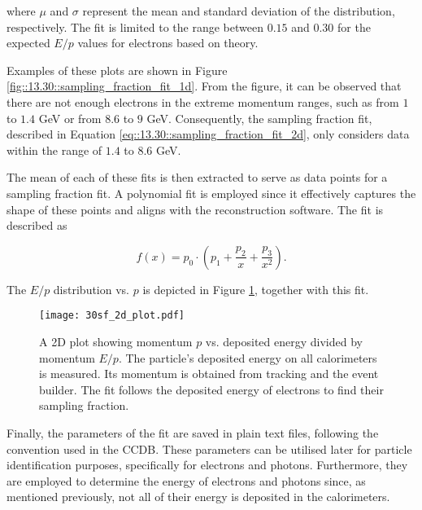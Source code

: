     where $\mu$ and $\sigma$ represent the mean and standard deviation of the distribution, respectively. The fit is limited to the range between $0.15$ and $0.30$ for the expected $E/p$ values for electrons based on theory.

    Examples of these plots are shown in Figure \ref{fig::13.30::sampling_fraction_fit_1d}.
    From the figure, it can be observed that there are not enough electrons in the extreme momentum ranges, such as from $1$ to $1.4$ GeV or from $8.6$ to $9$ GeV.
    Consequently, the sampling fraction fit, described in Equation \eqref{eq::13.30::sampling_fraction_fit_2d}, only considers data within the range of $1.4$ to $8.6$ GeV.

    The mean of each of these fits is then extracted to serve as data points for a sampling fraction fit.
    A polynomial fit is employed since it effectively captures the shape of these points and aligns with the reconstruction software.
    The fit is described as

    \begin{equation} \label{eq::13.30::sampling_fraction_fit_2d}
        f(x) = p_0 \cdot \left(p_1 + \frac{p_2}{x} + \frac{p_3}{x^2}\right).
    \end{equation}

    The $E/p$ distribution vs. $p$ is depicted in Figure \ref{fig::13.30::sampling_fraction_fit_2d}, together with this fit.

    \begin{figure}[t!]
        \texttt{[image: 30sf\_2d\_plot.pdf]}
        \caption[Calorimeters $p$ vs. $E/p$ plots]
        {A 2D plot showing momentum $p$ vs. deposited energy divided by momentum $E/p$.
        The particle's deposited energy on all calorimeters is measured.
        Its momentum is obtained from tracking and the event builder.
        The fit follows the deposited energy of electrons to find their sampling fraction.}
        \label{fig::13.30::sampling_fraction_fit_2d}
    \end{figure}

    Finally, the parameters of the fit are saved in plain text files, following the convention used in the CCDB.
    These parameters can be utilised later for particle identification purposes, specifically for electrons and photons.
    Furthermore, they are employed to determine the energy of electrons and photons since, as mentioned previously, not all of their energy is deposited in the calorimeters.
